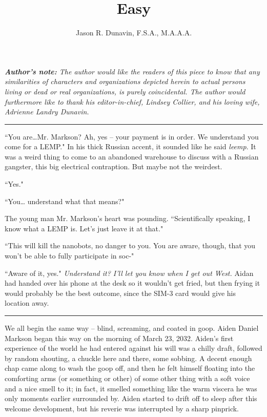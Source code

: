 \documentclass[11pt]{book}
\title{Easy}
\author{Jason R. Dunavin, F.S.A., M.A.A.A.}
\begin{document}
	\maketitle

	\textit{\textbf{Author's note:} The author would like the readers of this piece to know that any similarities of characters and organizations depicted herein to actual persons living or dead or real organizations, is purely coincidental. The author would furthermore like to thank his editor-in-chief, Lindsey Collier, and his loving wife, Adrienne Landry Dunavin.}
	
	\vspace{0.5cm}
	\hrule
	\vspace{0.5cm}
	
	``You are\dots  Mr. Markson? Ah, yes -- your payment is in order. We understand you come for a LEMP." In his thick Russian accent, it sounded like he said \textit{leemp}. It was a weird thing to come to an abandoned warehouse to discuss with a Russian gangster, this big electrical contraption. But maybe not the weirdest.
	
	``Yes."
	
	``You… understand what that means?"
	
	The young man Mr. Markson's heart was pounding. ``Scientifically speaking, I know what a LEMP is. Let's just leave it at that."
	
	``This will kill the nanobots, no danger to you. You are aware, though, that you won't be able to fully participate in soc-"
	
	``Aware of it, yes." \textit{Understand it? I'll let you know when I get out West.} Aidan had handed over his phone at the desk so it wouldn't get fried, but then frying it would probably be the best outcome, since the SIM-3 card would give his location away.
	
	\vspace{0.5cm}
	\hrule
	\vspace{0.5cm}
	
	We all begin the same way -- blind, screaming, and coated in goop. Aiden Daniel Markson began this way on the morning of March 23, 2032. Aiden's first experience of the world he had entered against his will was a chilly draft, followed by random shouting, a chuckle here and there, some sobbing. A decent enough chap came along to wash the goop off, and then he felt himself floating into the comforting arms (or something or other) of some other thing with a  soft voice and a nice smell to it; in fact, it smelled something like the warm viscera he was only moments earlier surrounded by. Aiden started to drift off to sleep after this welcome development, but his reverie was interrupted by a sharp pinprick.
	
\end{document}
